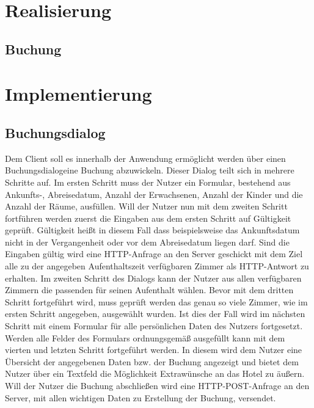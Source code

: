 \chapter{Realisierung}
\section{Buchung}



\chapter{Implementierung}
\section{Buchungsdialog}
Dem Client soll es innerhalb der Anwendung ermöglicht werden über einen \glqq Buchungsdialog\grqq \thickspace eine Buchung abzuwickeln. Dieser Dialog teilt sich in mehrere Schritte auf. Im ersten Schritt muss der Nutzer ein Formular, bestehend aus Ankunfts-, Abreisedatum, Anzahl der Erwachsenen, Anzahl der Kinder und die Anzahl der Räume, ausfüllen. Will der Nutzer nun mit dem zweiten Schritt fortführen werden zuerst die Eingaben aus dem ersten Schritt auf Gültigkeit geprüft. Gültigkeit heißt in diesem Fall dass beispielsweise das Ankunftsdatum nicht in der Vergangenheit oder vor dem Abreisedatum liegen darf. Sind die Eingaben gültig wird eine HTTP-Anfrage an den Server geschickt mit dem Ziel alle zu der angegeben Aufenthaltszeit verfügbaren Zimmer als HTTP-Antwort zu erhalten. Im zweiten Schritt des Dialogs kann der Nutzer aus allen verfügbaren Zimmern die passenden für seinen Aufenthalt wählen. Bevor mit dem dritten Schritt fortgeführt wird, muss geprüft werden das genau so viele Zimmer, wie im ersten Schritt angegeben, ausgewählt wurden. Ist dies der Fall wird im nächsten Schritt mit einem Formular für alle persönlichen Daten des Nutzers fortgesetzt. Werden alle Felder des Formulars ordnungsgemäß ausgefüllt kann mit dem vierten und letzten Schritt fortgeführt werden. In diesem wird dem Nutzer eine Übersicht der angegebenen Daten bzw. der Buchung angezeigt und bietet dem Nutzer über ein Textfeld die Möglichkeit Extrawünsche an das Hotel zu äußern. Will der Nutzer die Buchung abschließen wird eine HTTP-POST-Anfrage an den Server, mit allen wichtigen Daten zu Erstellung der Buchung, versendet.

